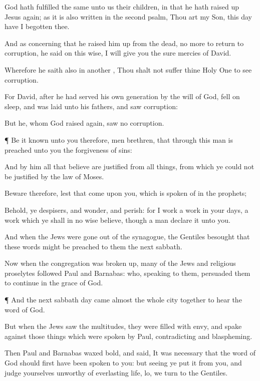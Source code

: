 {God hath
fulfilled the
same unto
us
their
children, in that he hath raised
up
Jesus
again;
as it
is
also
written
in the
second
psalm,
Thou
art
my
Son, this
day
have
I
begotten
thee.

And as concerning
that he
raised
him
up
from the
dead,
{} no
more
to
return
to
corruption, he
said on this
wise, I will
give
you the
sure
mercies of
David.

Wherefore he
saith
also
in
another
{}, Thou
shalt
not
suffer
thine Holy
One to
see
corruption.

For
David, after he had
served his
own
generation by the
will of
God, fell on
sleep,
and was
laid
unto
his
fathers,
and
saw
corruption:

But he,
whom
God raised
again,
saw
no
corruption.


\par }{\PP {}¶ Be
it
known unto
you
therefore,
men
{}
brethren,
that
through this
man is
preached unto
you the
forgiveness of
sins:

And
by
him
all that
believe are
justified
from all
things, from
which ye
could
not be
justified
by the
law of
Moses.

Beware
therefore,
lest that
come
upon
you, which is spoken
of
in the
prophets;

Behold, ye
despisers,
and
wonder,
and
perish:
for
I
work a
work
in
your
days, a
work
which ye
shall in no
wise
believe,
though a
man declare
it unto
you.

And
when the
Jews were
gone out
of the
synagogue, the
Gentiles
besought that
these
words might be
preached to
them the
next
sabbath.

Now
when the
congregation was broken
up,
many of the
Jews
and
religious
proselytes
followed
Paul
and
Barnabas:
who,
speaking to
them,
persuaded
them to continue
in the
grace of
God.


\par }{\PP {}¶
And the
next sabbath
day
came
almost the
whole
city
together to
hear the
word of
God.

But
when the
Jews
saw the
multitudes, they were
filled with
envy,
and spake
against those things which were
spoken
by
Paul,
contradicting
and
blaspheming.

Then
Paul
and
Barnabas waxed
bold, and
said, It
was
necessary that the
word of
God
should
first have been
spoken to
you:
but
seeing ye
put
it from
you,
and
judge
yourselves
unworthy of
everlasting
life,
lo, we
turn
to the
Gentiles.

}
